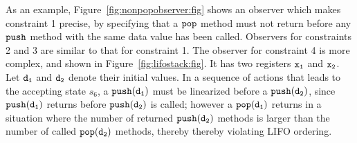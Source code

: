 As an example, Figure~\ref{fig:nonpopobserver:fig} shows an observer which
makes constraint 1 precise, by specifying
that a ${\tt pop}$ method must not return before any ${\tt push}$ method
with the same data value has been called.
Observers for constraints 2 and 3 are similar to that for constraint 1.
The observer for constraint 4 is more complex,
and shown in Figure~\ref{fig:lifostack:fig}.
It has two registers $\tt x_1$ and $\tt x_2$. Let $\tt d_1$ and $\tt d_2$
denote their initial values.
In a sequence of actions that leads to the accepting state $s_6$, a
${\tt push(d_1)}$ must be linearized before a ${\tt push(d_2)}$, since
${\tt push(d_1)}$ returns before ${\tt push(d_2)}$ is called; however
a ${\tt pop(d_1)}$ returns in a situation where the number of returned
${\tt push(d_2)}$ methods is larger than the number of called
${\tt pop(d_2)}$ methods, thereby thereby violating LIFO ordering.
